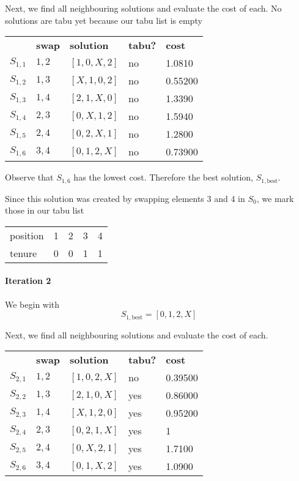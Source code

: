 \documentclass[a4paper]{article}
\newcommand{\subsubsubsection}[1]{\paragraph{#1} \mbox{}}
\begin{document}
Next, we find all neighbouring solutions and evaluate the cost of each. No solutions are tabu yet because our tabu list is empty

\begin{tabular}{lllll}
& \textbf{swap}   & \textbf{solution}    & \textbf{tabu?} & \textbf{cost}  \\

$S_{1,1}$ & $1,2$ & $[1, 0, X, 2]$ & no & 1.0810   \\
$S_{1,2}$ & $1,3$ & $[X, 1, 0, 2]$ & no & 0.55200  \\
$S_{1,3}$ & $1,4$ & $[2, 1, X, 0]$ & no & 1.3390   \\
$S_{1,4}$ & $2,3$ & $[0, X, 1, 2]$ & no & 1.5940   \\
$S_{1,5}$ & $2,4$ & $[0, 2, X, 1]$ & no & 1.2800   \\
$S_{1,6}$ & $3,4$ & $[0, 1, 2, X]$ & no & 0.73900  \\
\end{tabular}

Observe that $S_{1,6}$ has the lowest cost. Therefore the best solution, $S_{1, \text{best}}$.

Since this solution was created by swapping elements 3 and 4 in $S_0$, we mark those in our tabu list

\begin{tabular}{lllll}
position & 1 & 2 & 3 & 4 \\
tenure   & 0 & 0 & 1 & 1
\end{tabular}
\vspace{1.5em}

\subsubsubsection{Iteration 2}

We begin with $$S_{1, \text{best}} = [0, 1, 2, X]$$

Next, we find all neighbouring solutions and evaluate the cost of each.

\begin{tabular}{lllll}
& \textbf{swap}   & \textbf{solution}    & \textbf{tabu?} & \textbf{cost}  \\

$S_{2,1}$ & $1,2$ & $[1, 0, 2, X]$ & no  & 0.39500 \\
$S_{2,2}$ & $1,3$ & $[2, 1, 0, X]$ & yes & 0.86000 \\
$S_{2,3}$ & $1,4$ & $[X, 1, 2, 0]$ & yes & 0.95200 \\
$S_{2,4}$ & $2,3$ & $[0, 2, 1, X]$ & yes & 1       \\
$S_{2,5}$ & $2,4$ & $[0, X, 2, 1]$ & yes & 1.7100  \\
$S_{2,6}$ & $3,4$ & $[0, 1, X, 2]$ & yes & 1.0900  \\
\end{tabular}
\end{document}
